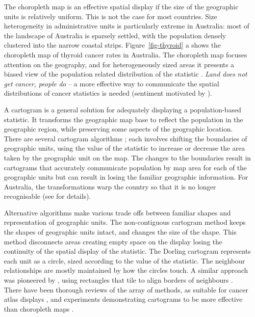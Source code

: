 \documentclass[
doublespace,
  times]{anzsauth}
\begin{document}
The choropleth map is an effective spatial display if the size of the
geographic units is relatively uniform. This is not the case for most
countries. Size heterogeneity in administrative units is particularly
extreme in Australia: most of the landscape of Australia is sparsely
settled, with the population densely clustered into the narrow coastal
strips. Figure~\ref{fig-thyroid} a shows the choropleth map of thyroid
cancer rates in Australia. The choropleth map focuses attention on the
geography, and for heterogeneously sized areas it presents a biased view
of the population related distribution of the statistic \citep{CBATCC}.
\emph{Land does not get cancer, people do} -- a more effective way to
communicate the spatial distributions of cancer statistics is needed
(sentiment motivated by \citet{monmonier2018how}).

A cartogram is a general solution for adequately displaying a
population-based statistic. It transforms the geographic map base to
reflect the population in the geographic region, while preserving some
aspects of the geographic location. There are several cartogram
algorithms \citep{ACTUC, CBATCC}; each involves shifting the boundaries
of geographic units, using the value of the statistic to increase or
decrease the area taken by the geographic unit on the map. The changes
to the boundaries result in cartograms that accurately communicate
population by map area for each of the geographic units but can result
in losing the familiar geographic information. For Australia, the
transformations warp the country so that it is no longer recognisable
(see \citet{KCR} for details).

Alternative algorithms make various trade offs between familiar shapes
and representation of geographic units. The non-contiguous cartogram
method \citep{NAC} keeps the shapes of geographic units intact, and
changes the size of the shape. This method disconnects areas creating
empty space on the display losing the continuity of the spatial display
of the statistic. The Dorling cartogram \citep{ACTUC} represents each
unit as a circle, sized according to the value of the statistic. The
neighbour relationships are mostly maintained by how the circles touch.
A similar approach was pioneered by \citet{RSCW}, using rectangles that
tile to align borders of neighbours \citep{CDWCS}. There have been
thorough reviews of the array of methods, as suitable for cancer atlas
displays \citep[e.g.][]{KCR, BCM}, and experiments demonstrating
cartograms to be more effective than choropleth maps \citep{KFIF}.
\end{document}
